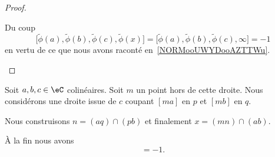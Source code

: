 \begin{proof}
\begin{subproof}
		Du coup
		\begin{equation}
			\big[ \tilde \phi(a),\tilde \phi(b), \tilde \phi(c),\tilde \phi(x) \big]=\big[ \tilde \phi(a),\tilde \phi(b), \tilde \phi(c), \infty \big]=-1
		\end{equation}
		en vertu de ce que nous avons raconté en~\ref{NORMooUWYDooAZTTWu}.

	\end{subproof}
\end{proof}

\begin{lemma}        \label{LEMooYBTHooABWkeo}
	Soit \( a,b,c\in \eC\) colinéaires. Soit \( m\) un point hors de cette droite. Nous considérons une droite issue de \( c\) coupant \( [ma]\) en \( p\) et \( [mb] \) en \( q\).

	Nous construisons \( n=(aq)\cap (pb)\) et finalement \( x=(mn)\cap (ab)\).

	À la fin nous avons
	\begin{equation}
		[a,b,c,x]=-1.
	\end{equation}
\end{lemma}

